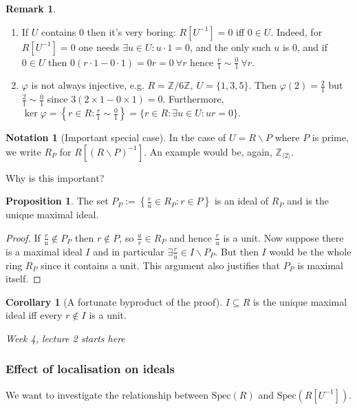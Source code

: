 \documentclass[a4paper]{article}
\newcommand{\la}{\langle}
\newcommand{\ra}{\rangle}
\newcommand{\Z}{\mathbb Z}
\newcommand{\Spec}{\text{Spec}}
\theoremstyle{definition}
\newtheorem{prop}[defn]{Proposition}
\newtheorem{coro}[defn]{Corollary}
\newtheorem*{remark}{Remark}
\newtheorem*{notation}{Notation}
\begin{document}
\begin{remark}
\begin{enumerate}
\item If $U$ contains 0 then it's very boring: $R[U^{-1}]=0$ iff $0\in U$. Indeed, for $R[U^{-1}]=0$ one needs $\exists u\in U:u\cdot 1=0$, and the only such $u$ is 0, and if $0\in U$ then $0(r\cdot1-0\cdot 1)=0r=0 \ \forall r$ hence $\frac{r}{1}\sim\frac01 \ \forall r$.
\item $\varphi$ is not always injective, e.g. $R=\Z/6\Z,\ U=\{1,3,5\}$. Then $\varphi(2)=\frac21$ but $\frac21 \sim \frac01$ since $3(2\times 1-0\times 1)=0$. Furthermore, $\ker\varphi=\left\{r\in R:\frac{r}{1}\sim \frac01\right\}=\{r\in R:\exists u\in U:ur=0\}$.
\end{enumerate}
\end{remark}

\begin{notation}[Important special case]
In the case of $U=R\backslash P$ where $P$ is prime, we write $R_P$ for $R[(R\backslash P)^{-1}]$. An example would be, again, $\Z_{\la2\ra}$.
\end{notation}
Why is this important?
\begin{prop}
The set $P_P:=\left\{\frac{r}{u}\in R_P:r\in P\right\}$ is an ideal of $R_P$ and is the unique maximal ideal.
\end{prop}
\begin{proof}
If $\frac{r}{u}\notin P_P$ then $r\notin P$, so $\frac{u}{r}\in R_P$ and hence $\frac{r}{u}$ is a unit. Now suppose there is a maximal ideal $I$ and in particular $\exists \frac{r}{u}\in I\backslash P_P$. But then $I$ would be the whole ring $R_P$ since it contains a unit. This argument also justifies that $P_P$ is maximal itself.
\end{proof}

\begin{coro}[A fortunate byproduct of the proof]
$I\subseteq R$ is the unique maximal ideal iff every $r\notin I$ is a unit.
\end{coro}

\begin{flushright}
\textit{Week 4, lecture 2 starts here}
\end{flushright}

\subsubsection{Effect of localisation on ideals}
We want to investigate the relationship between $\Spec(R)$ and $\Spec(R[U^{-1}])$.
\end{document}
